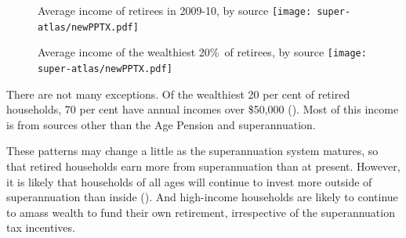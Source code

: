 \begin{figure}[p]
\begin{leftfullpage}
%
{Average income of retirees in 2009-10, by source}\label{fig:SUPER-3-3}
\texttt{[image: super-atlas/newPPTX.pdf]}

\end{leftfullpage}
\end{figure}
\begin{figure}[p]
\begin{fullpage}
%
{Average income of the wealthiest 20\%\ of retirees, by source}\label{fig:SUPER-3-4}
\texttt{[image: super-atlas/newPPTX.pdf]}

\end{fullpage}
\end{figure}

There are not many exceptions. Of the wealthiest 20 per cent of retired households, 70 per cent have annual incomes over \$50,000 (). Most of this income is from sources other than the Age Pension and superannuation. 

These patterns may change a little as the superannuation system matures, so that retired households earn more from superannuation than at present. However, it is likely that households of all ages will continue to invest more outside of superannuation than inside (). And high-income households are likely to continue to amass wealth to fund their own retirement, irrespective of the superannuation tax incentives.


